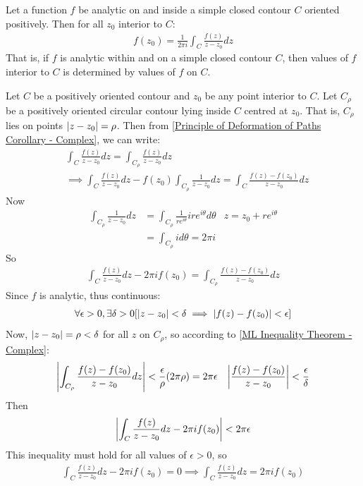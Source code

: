 \documentclass[12pt, english]{book}
\makeatletter
\renewenvironment{proof}[1][\proofname]{\par
	\pushQED{\qed}%
	\normalfont \topsep6\p@\@plus6\p@\relax
	\list{}{%
		\settowidth{\leftmargin}{\itshape\proofname:\hskip\labelsep}%
		\setlength{\labelwidth}{0pt}%
		\setlength{\itemindent}{-\leftmargin}%
		}%
	\item[\hskip\labelsep\itshape#1\@addpunct{:}]\ignorespaces
	}{\popQED\endlist\@endpefalse}
\makeatother
\begin{document}
	\begin{theorem}
		\label{Cauchy Integral Formula}
		Let a function \(f\) be analytic on and inside a simple closed contour \(C\) oriented positively. Then for all \(z_0\) interior to \(C\):
		\begin{align*}
			f(z_0) = \frac{1}{2\pi i} \int_{C} \frac{f(z)}{z - z_0} dz
		\end{align*}
		That is, if \(f\) is analytic within and on a simple closed contour \(C\), then values of \(f\) interior to \(C\) is determined by values of \(f\) on \(C\).
	\end{theorem}
	\begin{proof}
		Let  \(C\) be a positively oriented contour and \(z_0\) be any point interior to \(C\). Let \(C_\rho\) be a positively oriented circular contour lying inside \(C\) centred at \(z_0\). That is, \(C_\rho\) lies on points \(\abs{z - z_0} = \rho\). Then from \cref{Principle of Deformation of Paths Corollary - Complex}, we can write: 
		\begin{align*}
			&\int_{C} \frac{f(z)}{z-z_0} dz = \int_{C_\rho} \frac{f(z)}{z-z_0} dz  \\
			&\implies \int_{C} \frac{f(z)}{z-z_0} dz - f(z_0) \int_{C_\rho} \frac{1}{z-z_0} dz = \int_{C} \frac{f(z) - f(z_0)}{z-z_0} dz 
		\end{align*}
		Now
		\begin{align*}
			\int_{C_\rho} \frac{1}{z-z_0} dz 
			&= \int_{C_\rho} \frac{1}{re^{i\theta}} ire^{i\theta} d\theta & z = z_0 + re^{i\theta} \\
			&= \int_{C_\rho} i d\theta = 2\pi i
		\end{align*}
		So
		\begin{align*}
			\int_{C} \frac{f(z)}{z - z_0}dz - 2\pi i f(z_0) = \int_{C_\rho} \frac{f(z) - f(z_0)}{z - z_0} dz
		\end{align*}
		Since \(f\) is analytic, thus continuous:
		\begin{align*}
			\forall \epsilon>0, \exists \delta>0 [\abs{z-z_0}<\delta \implies \abs{f(z) - f(z_0)}<\epsilon]
		\end{align*}
		Now, \(\abs{z - z_0} = \rho < \delta\) for all \(z\) on \(C_\rho\), so according to \cref{ML Inequality Theorem - Complex}:
		\begin{align*}
			\abs{\int_{C_\rho} \frac{f(z) - f(z_0)}{z - z_0} dz} &< \frac{\epsilon}{\rho} (2 \pi \rho) = 2 \pi \epsilon & \abs{\frac{f(z) - f(z_0)}{z - z_0}} < \frac{\epsilon}{\delta}
		\end{align*}
		Then
		\begin{align*}
			\abs{\int_{C} \frac{f(z)}{z - z_0}dz - 2\pi i f(z_0)} < 2 \pi \epsilon
		\end{align*}
		This inequality must hold for all values of \(\epsilon > 0\), so
		\begin{align*}
			\int_{C} \frac{f(z)}{z - z_0}dz - 2\pi i f(z_0) = 0 \implies \int_{C} \frac{f(z)}{z - z_0} dz = 2 \pi i f(z_0)
		\end{align*}
	\end{proof}
	
\end{document}
